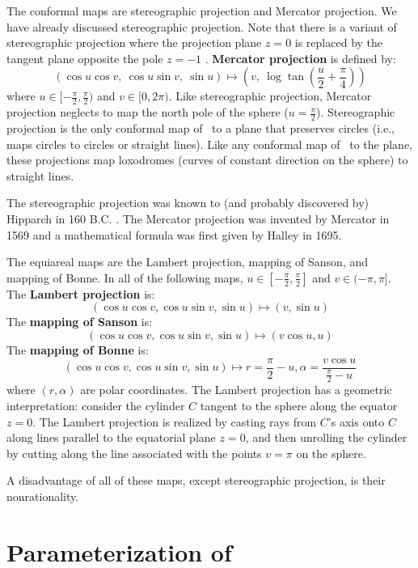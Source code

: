 The conformal maps are stereographic projection and Mercator projection.
We have already discussed stereographic projection.
Note that there is a variant of stereographic projection where
the projection plane $z=0$ is replaced by the tangent plane opposite the pole
$z=-1$ \cite{kreyszig59}.
{\bf Mercator projection} is defined by:
\[
	(\cos u \cos v,\ \cos u \sin v,\ \sin u) \mapsto
	(v,\ \log \tan (\frac{u}{2} + \frac{\pi}{4}))
\]
where $u \in [-\frac{\pi}{2}, \frac{\pi}{2})$ and $v \in [0,2\pi)$.
Like stereographic projection,
Mercator projection neglects to map the north pole of the sphere 
($u = \frac{\pi}{2}$).
Stereographic projection is the only conformal map of \ to a plane
that preserves circles (i.e., maps circles to circles or straight lines).
Like any conformal map of \ to the plane,
these projections map loxodromes (curves of 
constant direction on the sphere) to straight lines.

\begin{rmk}
The stereographic projection was known to (and probably discovered by)
Hipparch in 160 B.C. \cite{kreyszig59}. %
The Mercator projection was invented by Mercator in 1569
and a mathematical formula was first given by Halley in 1695. %
\end{rmk}

The equiareal maps are the Lambert projection, mapping of Sanson,
and mapping of Bonne.
In all of the following maps, 
$u \in [-\frac{\pi}{2}, \frac{\pi}{2}]$ and $v \in (-\pi,\pi]$.
The {\bf Lambert projection} is:
\[
	(\cos u \cos v, \cos u \sin v, \sin u) \mapsto
	(v, \sin u)
\]
The {\bf mapping of Sanson} is:
\[
	(\cos u \cos v, \cos u \sin v, \sin u) \mapsto
	(v \cos u, u)
\]
The {\bf mapping of Bonne} is:
\[
	(\cos u \cos v, \cos u \sin v, \sin u) \mapsto
	r = \frac{\pi}{2} - u, \alpha = \frac{v \cos u}{\frac{\pi}{2} - u}
\]
where $(r,\alpha)$ are polar coordinates.
The Lambert projection has a geometric interpretation:
consider the cylinder $C$ tangent to the sphere along the equator $z=0$.
The Lambert projection is realized by casting rays from $C$'s axis
onto $C$ along lines parallel to the equatorial plane $z=0$,
and then unrolling the cylinder by cutting along the line associated
with the points $v = \pi$ on the sphere.

A disadvantage of all of these maps, except stereographic projection,
is their nonrationality.

\section{Parameterization of }

